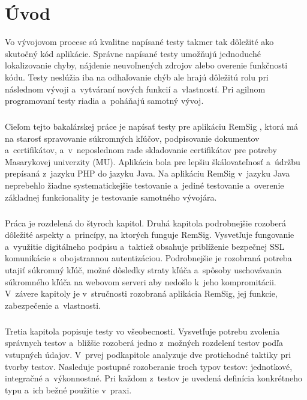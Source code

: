 \documentclass[
  printed, %
  table,   %
oneside,
  nolof,     %
  nolot,     %
]{fithesis3}
\begin{document}
\chapter{Úvod}
Vo vývojovom procese sú kvalitne napísané testy takmer tak dôležité ako skutočný kód aplikácie. Správne napísané testy umožňujú jednoduché lokalizovanie chyby, nájdenie neuvoľnených zdrojov alebo overenie funkčnosti kódu. Testy neslúžia iba na odhaľovanie chýb ale hrajú dôležitú rolu pri následnom vývoji a~vytváraní nových funkcií a~vlastností. Pri agilnom programovaní \cite{agileDef} testy riadia a~poháňajú samotný vývoj. \paragraph{}
Cieľom tejto bakalárskej práce je napísať testy pre aplikáciu RemSig \cite{remsigMuni}, ktorá má na starosť spravovanie súkromných kľúčov, podpisovanie dokumentov a~certifikátov, a~v~neposlednom rade skladovanie certifikátov pre potreby Masarykovej univerzity (MU). Aplikácia bola pre lepšiu škálovateľnosť a~údržbu prepísaná z~jazyku PHP do jazyku Java. Na aplikáciu RemSig  v~jazyku Java neprebehlo žiadne systematickejšie testovanie a~jediné testovanie a~overenie základnej funkcionality je testovanie samotného vývojára.\paragraph{}
Práca je rozdelená do štyroch kapitol. Druhá kapitola podrobnejšie rozoberá dôležité aspekty a~princípy, na ktorých funguje RemSig. Vysvetľuje fungovanie a~využitie digitálneho podpisu a~taktiež obsahuje priblíženie bezpečnej SSL komunikácie s~obojstrannou autentizáciou. Podrobnejšie je rozobraná potreba utajiť súkromný kľúč, možné dôsledky straty kľúča a~spôsoby uschovávania súkromného kľúča na webovom serveri aby nedošlo k~jeho kompromitácii. V~závere kapitoly  je v~stručnosti rozobraná aplikácia RemSig, jej funkcie, zabezpečenie a~vlastnosti. \paragraph{}
Tretia kapitola popisuje testy vo všeobecnosti. Vysvetľuje potrebu zvolenia správnych testov a~bližšie rozoberá jedno z~možných rozdelení testov podľa vstupných údajov. V~prvej podkapitole analyzuje dve protichodné taktiky pri tvorby testov. Nasleduje postupné rozoberanie troch typov testov: jednotkové, integračné a~výkonnostné. Pri každom z~testov je uvedená definícia konkrétneho typu a~ich bežné použitie v~praxi.\paragraph{}
\end{document}
